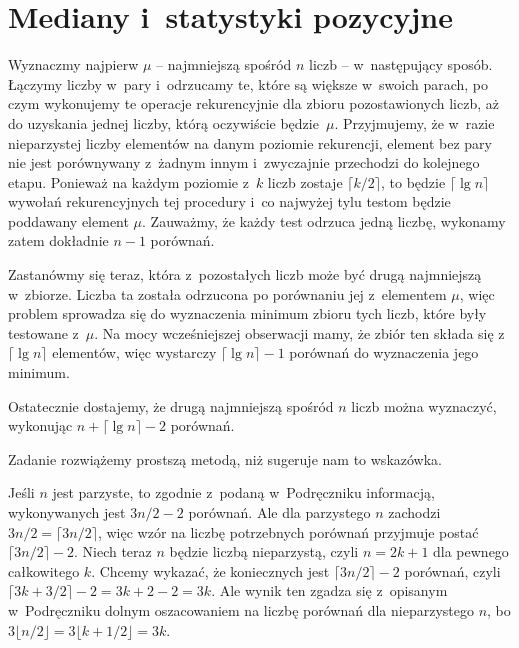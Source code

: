 \chapter{Mediany i~statystyki pozycyjne}


\exercise %
Wyznaczmy najpierw $\mu$ -- najmniejszą spośród $n$ liczb -- w~następujący sposób. Łączymy liczby w~pary i~odrzucamy te, które są większe w~swoich parach, po czym wykonujemy te operacje rekurencyjnie dla zbioru pozostawionych liczb, aż do uzyskania jednej liczby, którą oczywiście będzie~$\mu$. Przyjmujemy, że w~razie nieparzystej liczby elementów na danym poziomie rekurencji, element bez pary nie jest porównywany z~żadnym innym i~zwyczajnie przechodzi do kolejnego etapu. Ponieważ na każdym poziomie z~$k$ liczb zostaje $\lceil k/2\rceil$, to będzie $\lceil\lg n\rceil$ wywołań rekurencyjnych tej procedury i~co najwyżej tylu testom będzie poddawany element $\mu$. Zauważmy, że każdy test odrzuca jedną liczbę, wykonamy zatem dokładnie $n-1$ porównań.

Zastanówmy się teraz, która z~pozostałych liczb może być drugą najmniejszą w~zbiorze. Liczba ta została odrzucona po porównaniu jej z~elementem $\mu$, więc problem sprowadza się do wyznaczenia minimum zbioru tych liczb, które były testowane z~$\mu$. Na mocy wcześniejszej obserwacji mamy, że zbiór ten składa się z~$\lceil\lg n\rceil$ elementów, więc wystarczy $\lceil\lg n\rceil-1$ porównań do wyznaczenia jego minimum.

Ostatecznie dostajemy, że drugą najmniejszą spośród $n$ liczb można wyznaczyć, wykonując $n+\lceil\lg n\rceil-2$ porównań.

\exercise %
Zadanie rozwiążemy prostszą metodą, niż sugeruje nam to wskazówka.

Jeśli $n$ jest parzyste, to zgodnie z~podaną w~Podręczniku informacją, wykonywanych jest $3n/2-2$ porównań. Ale dla parzystego $n$ zachodzi $3n/2=\lceil3n/2\rceil$, więc wzór na liczbę potrzebnych porównań przyjmuje postać $\lceil3n/2\rceil-2$. Niech teraz $n$ będzie liczbą nieparzystą, czyli $n=2k+1$ dla pewnego całkowitego $k$. Chcemy wykazać, że koniecznych jest $\lceil3n/2\rceil-2$ porównań, czyli $\lceil3k+3/2\rceil-2=3k+2-2=3k$. Ale wynik ten zgadza się z~opisanym w~Podręczniku dolnym oszacowaniem na liczbę porównań dla nieparzystego $n$, bo $3\lfloor n/2\rfloor=3\lfloor k+1/2\rfloor=3k$.


